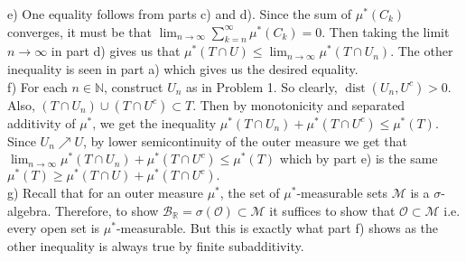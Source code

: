 \documentclass[12pt]{amsart} %
\newcommand\N{\ensuremath{\mathbb{N}}}
\newcommand\R{\ensuremath{\mathbb{R}}}
\def\N{\mathbb{N}}
\def\R{\mathbb{R}}
\newcommand{\dist} {\operatorname{dist}}
\begin{document}
e) One equality follows from parts c) and d). Since the sum of $\mu^*(C_k)$ converges, it must be that  $\lim_{n \to \infty} \sum_{k=n}^{\infty} \mu^*(C_k) = 0$. Then taking the limit $n \to \infty$ in part d) gives us that $\mu^*(T \cap U) \le \lim_{n \to \infty} \mu^*(T\cap U_n)$. The other inequality is seen in part a) which gives us the desired equality.\\ 

f) For each $n \in \N$, construct $U_n$ as in Problem 1. So clearly, $\dist(U_n, U^c) > 0$. Also,  $(T \cap U_n) \cup (T \cap U^c) \subset T$. Then by monotonicity and separated additivity of $\mu^*$, we get the inequality $\mu^*(T \cap U_n) + \mu^*(T \cap U^c) \leq \mu^*(T)$. Since $U_n \nearrow U$, by lower semicontinuity of the outer measure we get that $\lim_{n \to  \infty}\mu^*(T \cap U_n) + \mu^*(T \cap U^c) \leq \mu^*(T)$ which by part e) is the same $\mu^*(T)\ge \mu^*(T\cap U)+\mu^*(T\cap U^c).$ \\

g)  Recall that for an outer measure $\mu^*$, the set of $\mu^*$-measurable sets $\mathcal{M}$ is a $\sigma$-algebra. Therefore, to show $\mathcal{B}_{\R} = \sigma(\mathcal{O}) \subset \mathcal{M}$ it suffices to show that $\mathcal{O} \subset \mathcal{M}$ i.e. every open set is $\mu^*$-measurable. But this is exactly what part f) shows as the other inequality is always true by finite subadditivity.  
\end{document}
